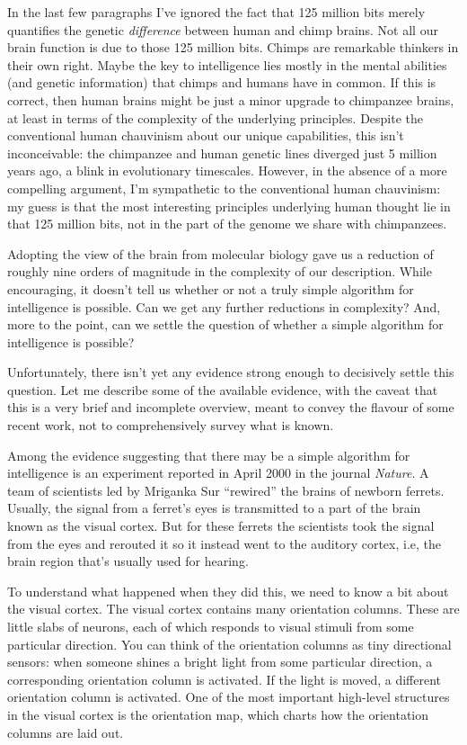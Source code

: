 In the last few paragraphs I've ignored the fact that 125 million bits merely quantifies the genetic \emph{difference} between human and chimp brains. Not all our brain function is due to those 125 million bits. Chimps are remarkable thinkers in their own right. Maybe the key to intelligence lies mostly in the mental abilities (and genetic information) that chimps and humans have in common. If this is correct, then human brains might be just a minor upgrade to chimpanzee brains, at least in terms of the complexity of the underlying principles. Despite the conventional human chauvinism about our unique capabilities, this isn't inconceivable: the chimpanzee and human genetic lines diverged just 5 million years ago, a blink in evolutionary timescales. However, in the absence of a more compelling argument, I'm sympathetic to the conventional human chauvinism: my guess is that the most interesting principles underlying human thought lie in that 125 million bits, not in the part of the genome we share with chimpanzees.


Adopting the view of the brain from molecular biology gave us a reduction of roughly nine orders of magnitude in the complexity of our description. While encouraging, it doesn't tell us whether or not a truly simple algorithm for intelligence is possible. Can we get any further reductions in complexity? And, more to the point, can we settle the question of whether a simple algorithm for intelligence is possible?


Unfortunately, there isn't yet any evidence strong enough to decisively settle this question. Let me describe some of the available evidence, with the caveat that this is a very brief and incomplete overview, meant to convey the flavour of some recent work, not to comprehensively survey what is known.


Among the evidence suggesting that there may be a simple algorithm for intelligence is an experiment reported in April 2000 in the journal \emph{Nature}. A team of scientists led by Mriganka Sur ``rewired'' the brains of newborn ferrets. Usually, the signal from a ferret's eyes is transmitted to a part of the brain known as the visual cortex. But for these ferrets the scientists took the signal from the eyes and rerouted it so it instead went to the auditory cortex, i.e, the brain region that's usually used for hearing.


To understand what happened when they did this, we need to know a bit about the visual cortex. The visual cortex contains many orientation columns. These are little slabs of neurons, each of which responds to visual stimuli from some particular direction. You can think of the orientation columns as tiny directional sensors: when someone shines a bright light from some particular direction, a corresponding orientation column is activated. If the light is moved, a different orientation column is activated. One of the most important high-level structures in the visual cortex is the orientation map, which charts how the orientation columns are laid out.



